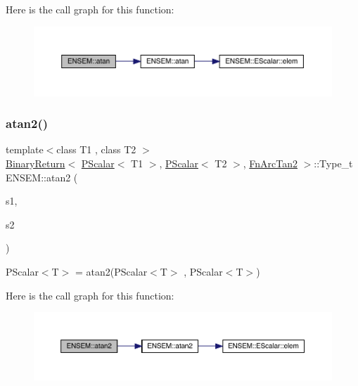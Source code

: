 Here is the call graph for this function\+:\nopagebreak
\begin{figure}[H]
\begin{center}
\leavevmode
\includegraphics[width=350pt]{db/dcc/group__primscalar_gad0db281b26948d9de5a2de123a357fe5_cgraph}
\end{center}
\end{figure}
\mbox{\label{group__primscalar_gac0968ffacdebb29c939e8bfbfc391fd0}} 
\subsubsection{\texorpdfstring{atan2()}{atan2()}}
{\footnotesize\ttfamily template$<$class T1 , class T2 $>$ \\
\mbox{\hyperlink{structENSEM_1_1BinaryReturn}{Binary\+Return}}$<$ \mbox{\hyperlink{classENSEM_1_1PScalar}{P\+Scalar}}$<$ T1 $>$, \mbox{\hyperlink{classENSEM_1_1PScalar}{P\+Scalar}}$<$ T2 $>$, \mbox{\hyperlink{structENSEM_1_1FnArcTan2}{Fn\+Arc\+Tan2}} $>$\+::Type\+\_\+t E\+N\+S\+E\+M\+::atan2 (\begin{DoxyParamCaption}\item[{const \mbox{\hyperlink{classENSEM_1_1PScalar}{P\+Scalar}}$<$ T1 $>$ \&}]{s1,  }\item[{const \mbox{\hyperlink{classENSEM_1_1PScalar}{P\+Scalar}}$<$ T2 $>$ \&}]{s2 }\end{DoxyParamCaption})\hspace{0.3cm}{\ttfamily [inline]}}



P\+Scalar$<$\+T$>$ = atan2(\+P\+Scalar$<$\+T$>$ , P\+Scalar$<$\+T$>$) 

Here is the call graph for this function\+:\nopagebreak
\begin{figure}[H]
\begin{center}
\leavevmode
\includegraphics[width=350pt]{db/dcc/group__primscalar_gac0968ffacdebb29c939e8bfbfc391fd0_cgraph}
\end{center}
\end{figure}
\mbox{\label{group__primscalar_ga32486e123809d21bcf028ab891ee845a}} 
